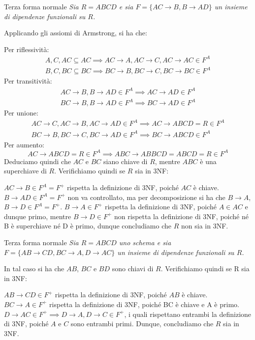 \begin{Example}{Terza forma normale}{}
    \textit{Sia $R = ABCD$ e sia $F = \{AC \to B, B \to AD\}$ un insieme di dipendenze funzionali su $R$. }
    
    Applicando gli assiomi di Armstrong, si ha che:
    
    Per riflessività:
    \begin{gather*}
        A, C, AC \subseteq AC \implies AC \to A, AC \to C, AC \to AC \in F^A\\
        B, C, BC \subseteq BC \implies BC \to B, BC \to C, BC \to BC \in F^A        
    \end{gather*}
    Per transitività:
    \begin{gather*}
        AC \to B, B \to AD \in F^A \implies AC \to AD \in F^A\\
        BC \to B, B \to AD \in F^A \implies BC \to AD \in F^A
    \end{gather*}
    Per unione:
    \begin{gather*}
        AC \to C, AC \to B, AC \to AD \in F^A \implies AC \to ABCD = R \in F^A\\
        BC \to B, BC \to C, BC \to AD \in F^A \implies BC \to ABCD \in F^A
    \end{gather*}
    Per aumento:
    \begin{equation*}
        AC \to ABCD = R \in F^A \implies ABC \to ABBCD = ABCD = R \in F^A        
    \end{equation*}
    Deduciamo quindi che $AC$ e $BC$ siano chiave di $R$, mentre $ABC$ è una superchiave di $R$. Verifichiamo quindi se $R$ sia in 3NF:

    $AC \to B \in F^A = F^+$ rispetta la definizione di 3NF, poiché $AC$ è chiave. $B \to AD \in F^A = F^+$ non va controllato, ma per decomposizione si ha che $B \to A$, $B \to D \in F^A = F^+$. $B \to A \in F^+$ rispetta la definizione di 3NF, poiché $A \in AC$ e dunque primo, mentre $B \to D \in F^+$ non rispetta la definizione di 3NF, poiché né B è superchiave né D è primo, dunque concludiamo che $R$ non sia in 3NF.
\end{Example}

\begin{Example}{Terza forma normale}{}
    \textit{Sia $R = ABCD$ uno schema e sia $F = \{AB \to CD, BC \to A, D \to AC\}$ un insieme di dipendenze funzionali su $R$. }
    
    In tal caso si ha che $AB$, $BC$ e $BD$ sono chiavi di $R$. Verifichiamo quindi se R sia in 3NF: 
    
    $AB \to CD \in F^+$ rispetta la definizione di 3NF, poiché $AB$ è chiave. $BC \to A \in F^+$ rispetta la definizione di 3NF, poiché BC è chiave e A è primo. $D \to AC \in F^+ \implies D \to A, D \to C \in F^+$, i quali rispettano entrambi la definizione di 3NF, poiché $A$ e $C$ sono entrambi primi. Dunque, concludiamo che $R$ sia in 3NF.
\end{Example}

